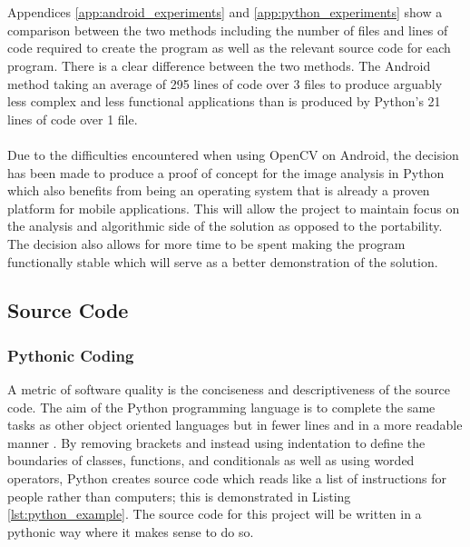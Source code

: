 		\\\\
		Appendices \ref{app:android_experiments} and \ref{app:python_experiments} show  a comparison between the two methods including the  number of files and lines of code required to create the program as well as the relevant source code for each program. There is a clear difference between the two methods. The Android method taking an average of 295 lines of code over 3 files to produce arguably less complex and less functional applications than is produced by Python’s 21 lines of code over 1 file.
		\\\\
		Due to the difficulties encountered when using OpenCV on Android,  the decision has been made to produce a proof of concept for the image analysis in Python which also benefits from being an  operating system that is already a proven platform for mobile applications. This will allow the project to maintain focus on the analysis and algorithmic side of the solution  as opposed to the portability. The decision also allows for more time to be spent making the program functionally stable which will serve as a better demonstration of the solution.
	\subsection{Source Code}
		\subsubsection{Pythonic Coding}
			A metric of software quality is the conciseness and descriptiveness of the source code. The aim of the Python programming language is to complete the same tasks as other object oriented languages but in fewer lines and in a more readable manner \citep{kuhlman2009python}. By removing brackets and instead using indentation to define the boundaries of classes, functions, and conditionals as well as using worded operators, Python creates source code which reads like a list of instructions for people rather than computers; this is demonstrated in Listing \ref{lst:python_example}. The source code for this project will be written in a pythonic way where it makes sense to do so.
